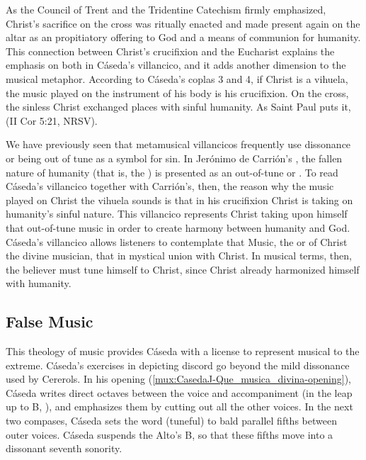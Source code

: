 As the Council of Trent and the Tridentine Catechism firmly emphasized,
Christ's sacrifice on the cross was ritually enacted and made present again on
the altar as an propitiatory offering to God and a means of communion for
humanity. 
This connection between Christ's crucifixion and the Eucharist explains the
emphasis on both in Cáseda's villancico, and it adds another dimension to the
musical metaphor.
According to Cáseda's coplas 3 and 4, if Christ is a vihuela, the music played
on the instrument of his body is his crucifixion.
On the cross, the sinless Christ exchanged places with sinful humanity.
As Saint Paul puts it,  (II Cor 5:21, NRSV).

We have previously seen that metamusical villancicos frequently use dissonance
or being out of tune as a symbol for sin. 
In Jerónimo de Carrión's , the fallen nature of
humanity (that is, the ) is presented as an out-of-tune or
.  %
To read Cáseda's villancico together with Carrión's, then, the reason why the
music played on Christ the vihuela sounds  is that in his
crucifixion Christ is taking on humanity's sinful nature.
This villancico represents Christ taking upon himself that out-of-tune music in
order to create harmony between humanity and God.
Cáseda's villancico allows listeners to contemplate that Music, the
 or  of Christ the divine
musician, that  in
mystical union with Christ.
In musical terms, then, the believer must tune himself to Christ, since Christ
already harmonized himself with humanity.

\subsection{False Music}

This theology of music provides Cáseda with a license to represent musical
 to the extreme.
Cáseda's exercises in depicting discord go beyond the mild dissonance used by
Cererols.
In his opening (\cref{mux:CasedaJ-Que_musica_divina-opening}), Cáseda writes
direct octaves between the voice and accompaniment (in the leap up to B\fl,
), and emphasizes them by cutting out all the other voices.
In the next two compases, Cáseda sets the word  (tuneful) to
bald parallel fifths between outer voices.
Cáseda suspends the Alto's B\fl, so that these fifths move into a dissonant
seventh sonority.

